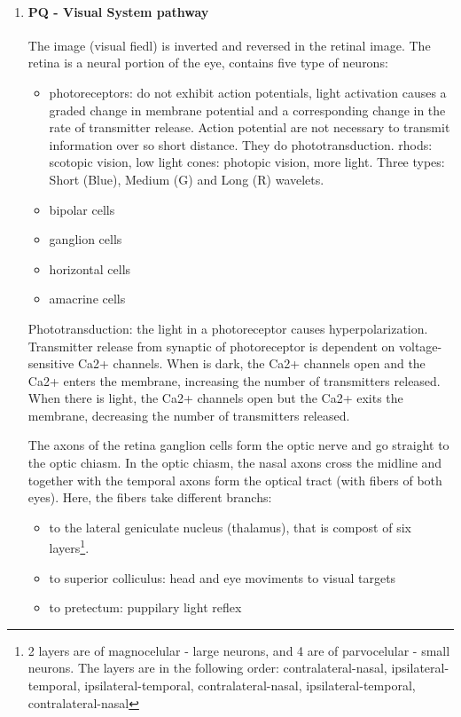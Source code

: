 \documentclass[12pt,article,oneside,a4paper]{memoir}
\begin{document}
\begin{enumerate}
\item \paragraph{PQ - Visual System pathway}

The image (visual fiedl) is inverted and reversed in the retinal image. The retina is a neural portion of the eye, contains five type of neurons:
\begin{itemize}
\item photoreceptors: do not exhibit action potentials, light activation causes a graded change in membrane potential and a corresponding change in the rate of transmitter release. Action potential are not necessary to transmit information over so short distance. They do phototransduction.
\subitem rhods: scotopic vision, low light
\subitem cones: photopic vision, more light. Three types: Short (Blue), Medium (G) and Long (R) wavelets.
\item bipolar cells
\item ganglion cells
\item horizontal cells
\item amacrine cells
\end{itemize} 

Phototransduction: the light in a photoreceptor causes hyperpolarization. Transmitter release from synaptic of photoreceptor is dependent on voltage-sensitive Ca2+ channels. When is dark, the Ca2+ channels open and the Ca2+ enters the membrane, increasing the number of transmitters released. When there is light, the Ca2+ channels open but the Ca2+ exits the membrane, decreasing the number of transmitters released.

The axons of the retina ganglion cells form the optic nerve and go straight to the optic chiasm. In the optic chiasm, the nasal axons cross the midline and together with the temporal axons form the optical tract (with fibers of both eyes). Here, the fibers take different branchs:
\begin{itemize}
\item to the lateral geniculate nucleus (thalamus), that is compost of six layers\footnote{2 layers are of magnocelular - large neurons, and 4 are of parvocelular - small neurons. The layers are in the following order: contralateral-nasal, ipsilateral-temporal, ipsilateral-temporal, contralateral-nasal, ipsilateral-temporal, contralateral-nasal}.
\item to superior colliculus: head and eye moviments to visual targets
\item to pretectum: puppilary light reflex
\end{itemize}


\end{enumerate}
\end{document}
